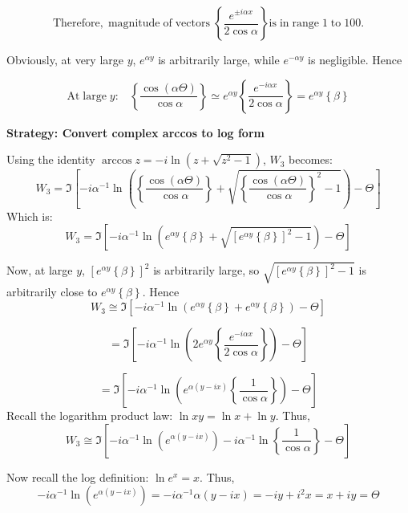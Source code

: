 \documentclass[a4paper]{report}
\begin{document}
\[ \mathrm{Therefore, \; magnitude \; of \; vectors \;}
 \left\{ \frac{ e^{ \pm i \alpha x}}{2 \cos \alpha} \right\} 
   \mathrm{is \; in \; range \; 1 \; to \; 100.}\]
   
Obviously, at very large $y$, $e^{\alpha y}$ is arbitrarily large, while $e^{-\alpha y}$ is negligible.  Hence

\[ \mathrm{At \; large \; }y: \;\;\; \left\{ \frac{\cos(\alpha \Theta)}{\cos \alpha} \right\}
\simeq
e^{\alpha y} \left\{ \frac{ e^{- i \alpha x}}{2 \cos \alpha} \right\}
= e^{\alpha y} \left\{ \beta \right\}  \]

\vspace{1em}
\textbf{Strategy: Convert complex arccos to log form}
\vspace{1em}

Using the identity $\arccos z = - i \ln (z + \sqrt{z^{2} - 1})$, $W_{3}$ becomes:
\[ W_{3} = \Im \left[  
 - i \alpha^{-1} \ln \left(
 \left\{ \frac{\cos(\alpha \Theta)}{\cos \alpha} \right\}
 + \sqrt{\left\{ \frac{\cos(\alpha \Theta)}{\cos \alpha} \right\}^{2} - 1} \right) 
  - \Theta  \right] \]
Which is:
\[ W_{3} = \Im \left[  
 - i \alpha^{-1} \ln \left(
 e^{\alpha y} \left\{ \beta \right\}
 + \sqrt{ \left[ e^{\alpha y} \left\{ \beta \right\} \right] ^{2} - 1} \right) 
  - \Theta  \right] \]  
  
Now, at large $y$, $ \left[ e^{\alpha y} \left\{ \beta \right\} \right] ^{2} $ is arbitrarily large, so 
$ \sqrt{ \left[ e^{\alpha y} \left\{ \beta \right\} \right] ^{2} - 1} $
is arbitrarily close to $ e^{\alpha y} \left\{ \beta \right\} $. 
Hence
\[ W_{3} \cong \Im \left[  
 - i \alpha^{-1} \ln \left(
   e^{\alpha y} \left\{ \beta \right\}
 + e^{\alpha y} \left\{ \beta \right\} \right) 
  - \Theta  \right] \]  

\[ = \Im \left[  
 - i \alpha^{-1} \ln \left(
   2 e^{\alpha y} \left\{ \frac{ e^{- i \alpha x}}{2 \cos \alpha} \right\}
    \right)  - \Theta  \right] \]  
    
\[ = \Im \left[  
 - i \alpha^{-1} \ln \left(
   e^{\alpha(y - ix)} \left\{ \frac{1}{ \cos \alpha} \right\}
    \right)  - \Theta  \right] \] 
Recall the logarithm product law: $\ln xy = \ln x + \ln y$.  Thus,
\[ W_{3} \cong \Im \left[  
 - i \alpha^{-1} \ln \left(  e^{\alpha(y - ix)} \right)
 - i \alpha^{-1} \ln  \left\{ \frac{1}{ \cos \alpha} \right\}
     - \Theta  \right] \] 

Now recall the log definition: $\ln e^{x} = x$. Thus,
 \[ - i \alpha^{-1} \ln \left(  e^{\alpha(y - ix)} \right)  =
 - i \alpha^{-1} \alpha (y - ix) = -iy + i^{2}x = x+iy = \Theta \]
\end{document}
